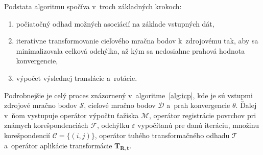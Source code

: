       Podstata algoritmu spočíva v~troch základných krokoch:
      \begin{enumerate}
        \item počiatočný odhad možných asociácií na základe vstupných dát,
        \item iteratívne transformovanie cieľového mračna bodov k~zdrojovému tak, aby sa minimalizovala celková odchýlka, až kým sa nedosiahne prahová hodnota konvergencie,
        \item výpočet výslednej translácie a~rotácie.
      \end{enumerate}

      \begin{algorithm}[b!]
        \caption{Základný ICP algoritmus podľa~\cite{baiICPAlgorithmTheory2023}}\label{alg:icp}
        \begin{algorithmic}[1]
          \State{$\varepsilon_0 \Leftarrow \infty$}
          

            \EndFor{}

          \EndWhile{}
        \end{algorithmic}
      \end{algorithm}

      Podrobnejšie je celý proces znázornený v~algoritme~\ref{alg:icp}, kde je sú vstupmi zdrojové mračno bodov $\mathcal{S}$, cieľové mračno bodov $\mathcal{D}$ a~prah konvergencie $\theta$. Ďalej v~ňom vystupuje operátor výpočtu ťažiska $\mathcal{M}$, operátor registrácie povrchov pri známych korešpondenciách $\mathcal{F}$, odchýlku $\varepsilon$ vypočítanú pre danú iteráciu, množinu korešpondencií $\mathcal{C} = \{(i, j)\}$, operátor tuhého transformačného odhadu $\mathcal{T}$ a~operátor aplikácie transformácie $\bm{T}_{\bm{R}, \bm{t}}$.

